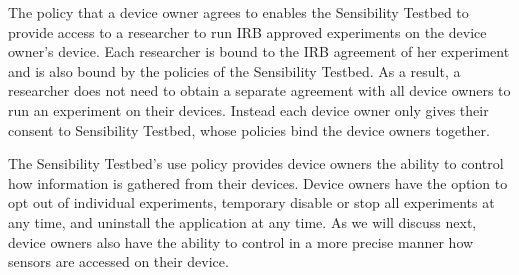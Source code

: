 %
%
%

The policy that a device owner agrees to enables the Sensibility Testbed to
provide access to a researcher to run IRB approved experiments on the device
owner's device.  Each researcher is bound to the IRB agreement of her
experiment and is also bound by the policies of the Sensibility Testbed.  As
a result, a researcher does not need to obtain a separate agreement with
all device owners to run an experiment on their devices.  Instead
each device owner only gives their consent to Sensibility Testbed, whose
policies bind the device owners together.


The Sensibility Testbed's use policy provides device owners the ability
to control how information is gathered from their devices. Device owners
have the option to opt out of individual experiments, temporary
disable or stop all experiments at any time, and uninstall the 
application at any time.  As we will discuss next,
device owners also have the ability to control in a more precise manner
how sensors are accessed on their device.


